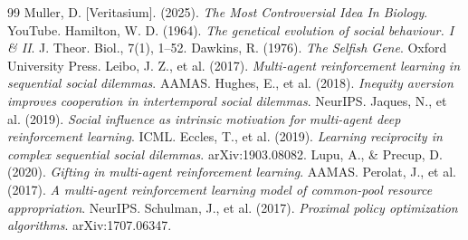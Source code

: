 \documentclass{article}
\begin{document}
\begin{thebibliography}{99}
 Muller, D. [Veritasium]. (2025). \textit{The Most Controversial Idea In Biology}. YouTube.
 Hamilton, W. D. (1964). \textit{The genetical evolution of social behaviour. I \& II}. J. Theor. Biol., 7(1), 1--52.
 Dawkins, R. (1976). \textit{The Selfish Gene}. Oxford University Press.
 Leibo, J. Z., et al. (2017). \textit{Multi-agent reinforcement learning in sequential social dilemmas}. AAMAS.
 Hughes, E., et al. (2018). \textit{Inequity aversion improves cooperation in intertemporal social dilemmas}. NeurIPS.
 Jaques, N., et al. (2019). \textit{Social influence as intrinsic motivation for multi-agent deep reinforcement learning}. ICML.
 Eccles, T., et al. (2019). \textit{Learning reciprocity in complex sequential social dilemmas}. arXiv:1903.08082.
 Lupu, A., \& Precup, D. (2020). \textit{Gifting in multi-agent reinforcement learning}. AAMAS.
 Perolat, J., et al. (2017). \textit{A multi-agent reinforcement learning model of common-pool resource appropriation}. NeurIPS.
 Schulman, J., et al. (2017). \textit{Proximal policy optimization algorithms}. arXiv:1707.06347.
\end{thebibliography}
\end{document}
